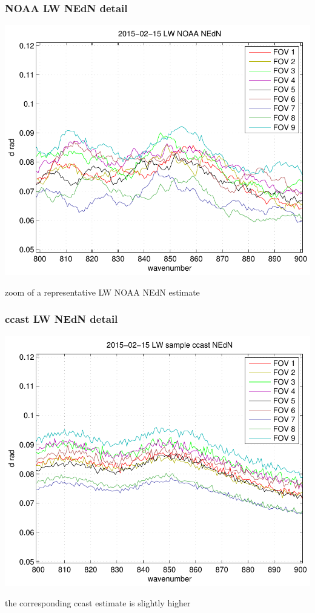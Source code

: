 \documentclass[11pt]{beamer}
\begin{document}
\begin{frame}
\frametitle{NOAA LW NEdN detail}

\begin{center}
  \includegraphics[scale=0.54]{figures/nedn_noaa_LW.pdf}
\end{center}

\centerline{zoom of a representative LW NOAA NEdN estimate}

\end{frame}
\begin{frame}
\frametitle{ccast LW NEdN detail}

\begin{center}
  \includegraphics[scale=0.54]{figures/nedn_ccast_LW.pdf}
\end{center}

\centerline{the corresponding ccast estimate is slightly higher}

\end{frame}
\end{document}
